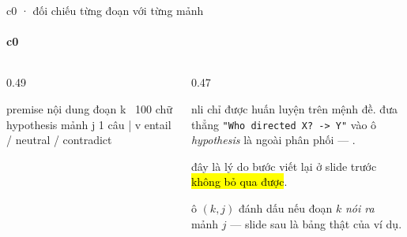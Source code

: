 \begin{frame}[fragile]{c0 · đối chiếu từng đoạn với từng mảnh}
  \framesubtitle{c0}

  \begin{columns}[t]
  \begin{column}{0.49\textwidth}
    \begin{keyb}[title={công cụ: một model nli nhỏ}]
      \begin{dia}
premise     nội dung đoạn k     ~100 chữ
hypothesis  mảnh j              1 câu
                 |
                 v
         entail / neutral / contradict
      \end{dia}
      \vspace{0.25em}
    \end{keyb}
  \end{column}
  \begin{column}{0.47\textwidth}
    \begin{badb}[title={nên mảnh PHẢI là câu khẳng định}]
      nli chỉ được huấn luyện trên mệnh đề. đưa thẳng
      \texttt{"Who directed X? -> Y"} vào ô \emph{hypothesis} là ngoài phân phối —
      .
      \vspace{0.25em}

      đây là lý do bước viết lại ở slide trước \hl{không bỏ qua được}.
    \end{badb}
    \begin{bx}[title={kết quả gọi là bảng phủ}]
      ô $(k, j)$ đánh dấu nếu đoạn $k$ \emph{nói ra} mảnh $j$ — slide sau là bảng
      thật của ví dụ.
    \end{bx}
  \end{column}
  \end{columns}
\end{frame}

